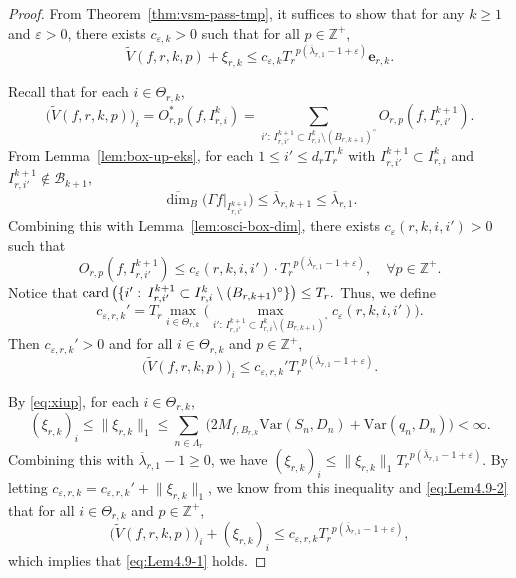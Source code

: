 \documentclass[11pt]{amsart}
\theoremstyle{definition}
\theoremstyle{remark}
\numberwithin{equation}{section}
\newcommand{\Z}{{\mathbb Z}}
\newcommand{\bfe}{{\mathbf e}}
\newcommand{\mB}{{\mathcal B}}
\newcommand{\uplam}{{\overline{\lambda}}}
\newcommand{\Var}{\mathrm{Var}}
\def\vep{\varepsilon}
\def\updimB{\overline{\dim}_B}
\newcommand{\card}{{\rm card\,}}
\begin{document}
\begin{proof}
	From Theorem~\ref{thm:vsm-pass-tmp}, it suffices to show that for any $k\geq 1$ and $\vep>0$, 
	there exists $c_{\vep,k}>0$ such that for all $p \in \mathbb{Z}^+$,
	\begin{equation}\label{eq:Lem4.9-1}
		\widetilde{V}(f,r,k,p) +\xi_{r,k} \leq c_{\vep,k} {T_r}^ {p (\uplam_{r,1}-1+\vep)} \bfe_{r,k} .
	\end{equation}
	
	Recall that for each $i\in \Theta_{r,k}$,
	\[
	\big(\widetilde{V}(f,r,k,p)\big)_i=
	 O_{r,p}^*(f,I_{r,i}^k)=
	\sum_{i':\, I_{r,i'}^{k+1}\subset I_{r,i}^k\setminus (B_{r,k+1})^{\circ}} O_{r,p}(f,I_{r,i'}^{k+1}).
	\]
	From Lemma~\ref{lem:box-up-eks}, 
	for each $1\leq i'\leq d_r {T_r}^{k}$ with $I_{r,i'}^{k+1}\subset I_{r,i}^k$ and $I_{r,i'}^{k+1}\not\in 
	\mB_{k+1}$, 
	\[
	  \updimB \big(\Gamma f|_{I_{r,i'}^{k+1}} \big) 	\leq \uplam_{r,k+1} \leq\uplam_{r,1}.
	\]
	Combining this with Lemma~\ref{lem:osci-box-dim}, there exists $c_{\vep}(r,k,i,i')>0$ such that
	\[
	  O_{r,p}(f,I_{r,i'}^{k+1}) \leq  c_{\vep}(r,k,i,i') \cdot {T_r}^{p ( \uplam_{r,1} -1+\vep)}, \quad \forall p \in \mathbb{Z}^+ .
	\]
	Notice that
	$ 
	\card\big(\{i':\, I_{r,i'}^{k+1}\subset I_{r,i}^k\setminus (B_{r,k+1})^{\circ}\}\big)\leq T_r.
	$
	Thus, we define
	\[
	  c_{\vep,r,k}'=T_r \max_{i \in \Theta_{r,k} } \Big( \max_{i':\, I_{r,i'}^{k+1}\subset I_{r,i}^k\setminus (B_{r,k+1})^{\circ}} c_{\vep}(r,k,i,i')\Big).
	\]
	Then $c_{\vep,r,k}'>0$ and for all $i\in \Theta_{r,k}$ and $p\in \Z^+$,
	\begin{equation}\label{eq:Lem4.9-2}
		\big(\widetilde{V}(f,r,k,p)\big)_i\leq c_{\vep,r,k}' {T_r}^{p ( \uplam_{r,1} -1+\vep)}.
	\end{equation}
	
	By \eqref{eq:xiup}, for each $i\in \Theta_{r,k}$,
	\begin{equation*}
		(\xi_{r,k})_i\leq \lVert \xi_{r,k}\rVert_1 \leq\sum_{n \in \Lambda_r}\Big(2M_{f,B_{r,k}} \Var (S_n,D_n)+\Var(q_n,D_n)\Big)<\infty.
	\end{equation*}
	Combining this with $\uplam_{r,1}-1\geq 0$, we have $(\xi_{r,k})_i\leq \lVert \xi_{r,k}\rVert_1 {T_r}^{p(\uplam_{r,1}-1+\vep)}$. By letting $c_{\vep,r,k}=c_{\vep,r,k}'+\lVert \xi_{r,k}\rVert_1$, we know from this inequality and \eqref{eq:Lem4.9-2} that for all $i\in \Theta_{r,k}$ and $p\in \Z^+$,
	\[
	\big(\widetilde{V}(f,r,k,p)\big)_i + (\xi_{r,k})_i\leq c_{\vep,r,k} {T_r}^{p ( \uplam_{r,1} -1+\vep)},
	\]
	which implies that \eqref{eq:Lem4.9-1} holds.
\end{proof}
\end{document}
